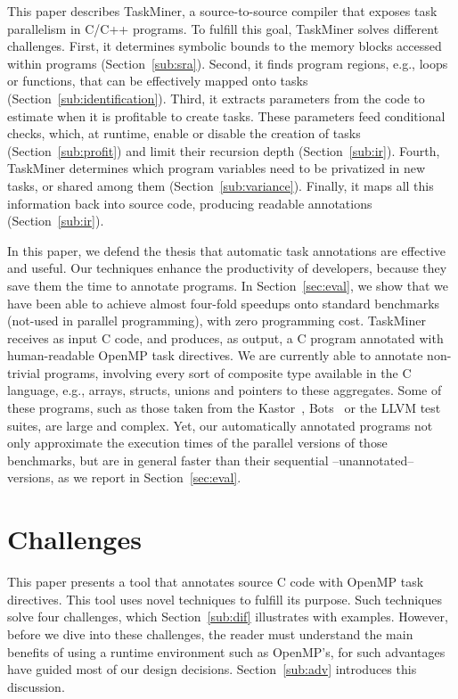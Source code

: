 \documentclass[sigplan,10pt,screen]{acmart}
\newcommand\Taskminer{\mbox{\textsf{TaskMiner}}}
\begin{document}
This paper describes \Taskminer, a source-to-source compiler that exposes task
parallelism in C/C++ programs.
To fulfill this goal, \Taskminer{} solves different challenges.
First, it determines symbolic bounds to the memory blocks accessed within
programs (Section~\ref{sub:sra}).
Second, it finds program regions, e.g., loops or functions, that can be
effectively mapped onto tasks (Section~\ref{sub:identification}).
Third, it extracts parameters from the code to estimate when it is profitable to
create tasks.
These parameters feed conditional checks, which, at runtime, enable or disable
the creation of tasks (Section~\ref{sub:profit}) and limit their recursion
depth (Section~\ref{sub:ir}).
Fourth, \Taskminer{} determines which program variables need to be 
privatized in new tasks, or shared among them (Section~\ref{sub:variance}).
Finally, it maps all this information back into source code, producing
readable annotations (Section~\ref{sub:ir}).

In this paper, we defend the thesis that automatic task annotations are
effective and useful.
Our techniques enhance the productivity of developers, because they save them
the time to annotate programs.
In Section~\ref{sec:eval}, we show that we have been able to achieve almost
four-fold speedups onto standard benchmarks (not-used in parallel programming),
with zero programming cost.
\Taskminer{} receives as input C code, and produces, as output, a C
program annotated with human-readable OpenMP task directives.
We are currently able to annotate non-trivial programs, involving every
sort of composite type available in the C language, e.g., arrays, structs,
unions and pointers to these aggregates.
Some of these programs, such as those taken from the
Kastor~\cite{Virouleau14}, Bots~\cite{Duran09} or the LLVM test
suites, are large and complex.
Yet, our automatically annotated programs not only approximate the execution
times of the parallel versions of those benchmarks, but are in general faster
than their sequential --unannotated-- versions, as we report in
Section~\ref{sec:eval}.

\section{Challenges}
\label{sec:ovf}

This paper presents a tool that annotates source C code with OpenMP task
directives.
This tool uses novel techniques to fulfill its purpose.
Such techniques solve four challenges, which Section~\ref{sub:dif}
illustrates with examples.
However, before we dive into these challenges, the reader must understand
the main benefits of using a runtime environment such as OpenMP's, for
such advantages have guided most of our design decisions.
Section~\ref{sub:adv} introduces this discussion.
\end{document}
